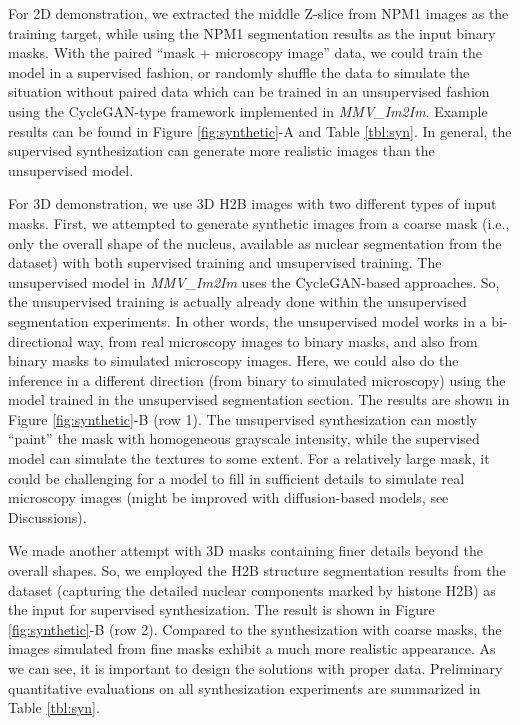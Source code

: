 For 2D demonstration, we extracted the middle Z-slice from NPM1 images as the training target, while using the NPM1 segmentation results as the input binary masks. With the paired ``mask + microscopy image'' data, we could train the model in a supervised fashion, or randomly shuffle the data to simulate the situation without paired data which can be trained in an unsupervised fashion using the CycleGAN-type framework implemented in \emph{MMV\_Im2Im}. Example results can be found in Figure \ref{fig:synthetic}-A and Table \ref{tbl:syn}. In general, the supervised synthesization can generate more realistic images than the unsupervised model.

For 3D demonstration, we use 3D H2B images with two different types of input masks. First, we attempted to generate synthetic images from a coarse mask (i.e., only the overall shape of the nucleus, available as nuclear segmentation from the dataset) with both supervised training and unsupervised training. The unsupervised model in \emph{MMV\_Im2Im} uses the CycleGAN-based approaches. So, the unsupervised training is actually already done within the unsupervised segmentation experiments. In other words, the unsupervised model works in a bi-directional way, from real microscopy images to binary masks, and also from binary masks to simulated microscopy images. Here, we could also do the inference in a different direction (from binary to simulated microscopy) using the model trained in the unsupervised segmentation section. The results are shown in Figure \ref{fig:synthetic}-B (row 1). The unsupervised synthesization can mostly ``paint'' the mask with homogeneous grayscale intensity, while the supervised model can simulate the textures to some extent. For a relatively large mask, it could be challenging for a model to fill in sufficient details to simulate real microscopy images (might be improved with diffusion-based models, see Discussions).

We made another attempt with 3D masks containing finer details beyond the overall shapes. So, we employed the H2B structure segmentation results from the dataset (capturing the detailed nuclear components marked by histone H2B) as the input for supervised synthesization. The result is shown in Figure \ref{fig:synthetic}-B (row 2). Compared to the synthesization with coarse masks, the images simulated from fine masks exhibit a much more realistic appearance. As we can see, it is important to design the solutions with proper data. Preliminary quantitative evaluations on all synthesization experiments are summarized in Table \ref{tbl:syn}.

